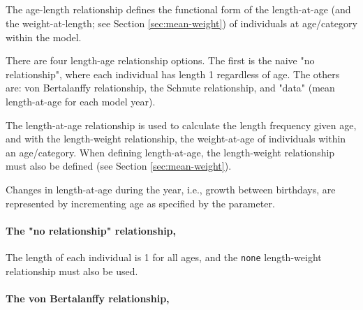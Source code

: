 \subsection{\label{sec:age-at-age}}

The age-length relationship defines the functional form of the length-at-age (and the weight-at-length; see Section \ref{sec:mean-weight}) of individuals at age/category within the model.

There are four length-age relationship options. The first is the naive "no relationship", where each individual has length 1 regardless of age. The others are:  von Bertalanffy relationship, the Schnute relationship, and "data" (mean length-at-age for each model year).

The length-at-age relationship is used to calculate the length frequency given age, and with the length-weight relationship, the weight-at-age of individuals within an age/category. When defining length-at-age, the length-weight relationship must also be defined (see Section \ref{sec:mean-weight}).

Changes in length-at-age during the year, i.e., growth between birthdays, are represented by incrementing age as specified by the  parameter.


\paragraph[None]{The "no relationship" relationship, }

The length of each individual is 1 for all ages, and the \texttt{none} length-weight relationship must also be used.

\paragraph[von Bertalanffy]{The von Bertalanffy relationship, }

